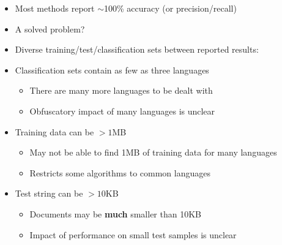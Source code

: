 \documentclass[a4paper,landscape,headrule,footrule,xetex]{foils}
\begin{document}

\begin{itemize}
\item Most methods report $\sim$100\% accuracy (or precision/recall)
\item A solved problem?
\end{itemize}





\begin{itemize}
\item Diverse training/test/classification sets between reported results:
\item Classification sets contain as few as three languages
\begin{itemize}
\item There are many more languages to be dealt with
\item Obfuscatory impact of many languages is unclear
\end{itemize}
\item Training data can be $>1$MB
\begin{itemize}
\item May not be able to find 1MB of training data for many languages
\item Restricts some algorithms to common languages
\end{itemize}
\item Test string can be $>10$KB
\begin{itemize}
\item Documents may be \textbf{much} smaller than 10KB
\item Impact of performance on small test samples is unclear
\end{itemize}
\end{itemize}









\end{document}
